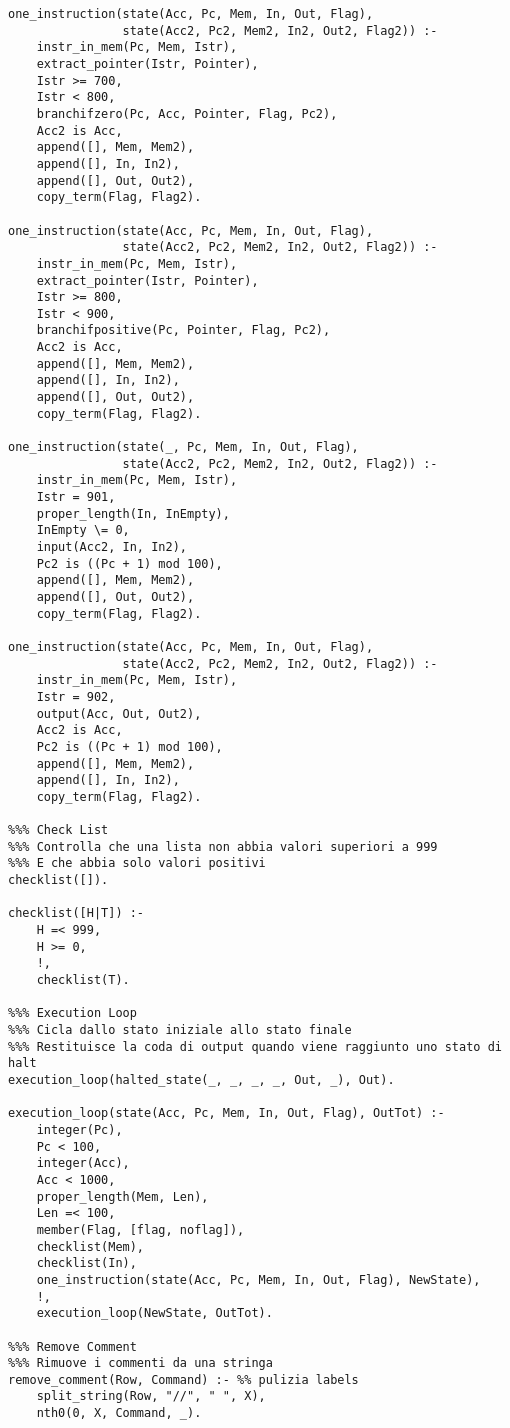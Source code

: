 \documentclass[a4paper,12pt, oneside]{book}
\begin{document}
\begin{verbatim}
one_instruction(state(Acc, Pc, Mem, In, Out, Flag), 
                state(Acc2, Pc2, Mem2, In2, Out2, Flag2)) :- 
    instr_in_mem(Pc, Mem, Istr),
    extract_pointer(Istr, Pointer),
    Istr >= 700,
    Istr < 800,
    branchifzero(Pc, Acc, Pointer, Flag, Pc2),
    Acc2 is Acc,
    append([], Mem, Mem2),
    append([], In, In2),
    append([], Out, Out2),
    copy_term(Flag, Flag2).

one_instruction(state(Acc, Pc, Mem, In, Out, Flag), 
                state(Acc2, Pc2, Mem2, In2, Out2, Flag2)) :- 
    instr_in_mem(Pc, Mem, Istr),
    extract_pointer(Istr, Pointer),
    Istr >= 800,
    Istr < 900,
    branchifpositive(Pc, Pointer, Flag, Pc2),
    Acc2 is Acc,
    append([], Mem, Mem2),
    append([], In, In2),
    append([], Out, Out2),
    copy_term(Flag, Flag2).

one_instruction(state(_, Pc, Mem, In, Out, Flag), 
                state(Acc2, Pc2, Mem2, In2, Out2, Flag2)) :- 
    instr_in_mem(Pc, Mem, Istr),
    Istr = 901,
    proper_length(In, InEmpty),
    InEmpty \= 0,
    input(Acc2, In, In2),
    Pc2 is ((Pc + 1) mod 100),
    append([], Mem, Mem2),
    append([], Out, Out2),
    copy_term(Flag, Flag2).

one_instruction(state(Acc, Pc, Mem, In, Out, Flag), 
                state(Acc2, Pc2, Mem2, In2, Out2, Flag2)) :- 
    instr_in_mem(Pc, Mem, Istr),
    Istr = 902,
    output(Acc, Out, Out2),
    Acc2 is Acc,
    Pc2 is ((Pc + 1) mod 100),
    append([], Mem, Mem2),
    append([], In, In2),
    copy_term(Flag, Flag2).

%%% Check List
%%% Controlla che una lista non abbia valori superiori a 999
%%% E che abbia solo valori positivi
checklist([]).

checklist([H|T]) :- 
    H =< 999,
    H >= 0,
    !,
    checklist(T).

%%% Execution Loop
%%% Cicla dallo stato iniziale allo stato finale
%%% Restituisce la coda di output quando viene raggiunto uno stato di halt
execution_loop(halted_state(_, _, _, _, Out, _), Out).

execution_loop(state(Acc, Pc, Mem, In, Out, Flag), OutTot) :-
    integer(Pc),
    Pc < 100,
    integer(Acc),
    Acc < 1000,
    proper_length(Mem, Len),
    Len =< 100,
    member(Flag, [flag, noflag]),
    checklist(Mem),
    checklist(In),
    one_instruction(state(Acc, Pc, Mem, In, Out, Flag), NewState),
    !,
    execution_loop(NewState, OutTot).

%%% Remove Comment
%%% Rimuove i commenti da una stringa 
remove_comment(Row, Command) :- %% pulizia labels
    split_string(Row, "//", " ", X),
    nth0(0, X, Command, _).


\end{verbatim}
\end{document}
